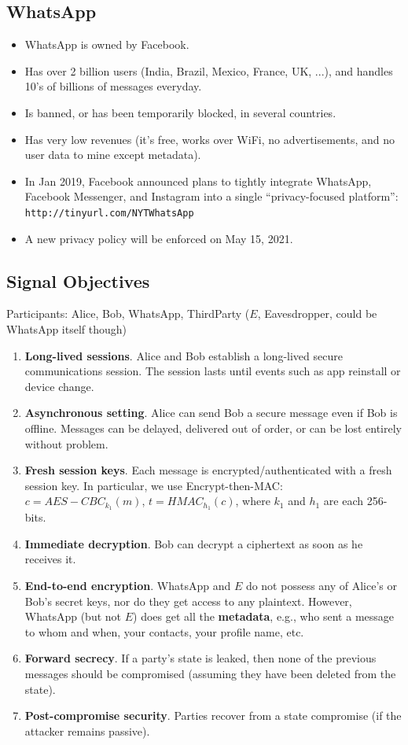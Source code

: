 \documentclass[12pt,titlepage]{article}
\begin{document}
\subsection{WhatsApp}
\begin{itemize}
	\item WhatsApp is owned by Facebook.
	\item Has over 2 billion users (India, Brazil, Mexico, France, UK, ...), and handles 10’s of billions of messages everyday.
	\item Is banned, or has been temporarily blocked, in several countries.
	\item Has very low revenues (it’s free, works over WiFi, no advertisements, and no user data to mine except metadata).
	\item In Jan 2019, Facebook announced plans to tightly integrate WhatsApp, Facebook Messenger, and Instagram into a single ``privacy-focused platform'': \texttt{http://tinyurl.com/NYTWhatsApp}
	\item A new privacy policy will be enforced on May 15, 2021.
\end{itemize}
\subsection{Signal Objectives}
Participants: Alice, Bob, WhatsApp, ThirdParty ($E$, Eavesdropper, could be WhatsApp itself though)
\begin{enumerate}
	\item \textbf{Long-lived sessions}. Alice and Bob establish a long-lived secure communications session. The session lasts until events such as app reinstall or device change.
	\item \textbf{Asynchronous setting}. Alice can send Bob a secure message even if Bob is offline. Messages can be delayed, delivered out of order, or can be lost entirely without problem.
	\item \textbf{Fresh session keys}. Each message is encrypted/authenticated with a fresh session key. In particular, we use Encrypt-then-MAC: $c = AES-CBC_{k_1}(m)$, $t = HMAC_{h_1} (c)$, where $k_1$ and $h_1$ are each 256-bits.
	\item \textbf{Immediate decryption}. Bob can decrypt a ciphertext as soon as he receives it.
	\item \textbf{End-to-end encryption}. WhatsApp and $E$ do not possess any of Alice’s or Bob’s secret keys, nor do they get access to any plaintext. However, WhatsApp (but not $E$) does get all the \textbf{metadata}, e.g., who sent a message to whom and when, your contacts, your profile name, etc.
	\item \textbf{Forward secrecy}. If a party’s state is leaked, then none of the previous messages should be compromised (assuming they have been deleted from the state).
	\item \textbf{Post-compromise security}. Parties recover from a state compromise (if the attacker remains passive).
\end{enumerate}
\end{document}
